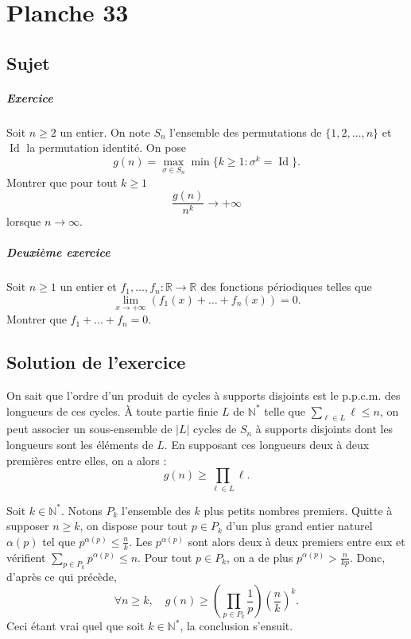 \chapter{Planche 33}

\section{Sujet}

\paragraph{Exercice}

Soit $n \geqslant 2$ un entier.
On note $S_n$ l'ensemble des permutations de $\{1,2,\dots,n\}$ et $\operatorname{Id}$ la permutation identité.
On pose
$$
g(n) = \max_{\sigma \in S_n} \min \{k \geqslant 1 : \sigma^k = \operatorname{Id}\}.
$$
Montrer que pour tout $k \geqslant 1$
\[\frac{g(n)}{n^k} \to +\infty
\]
lorsque $n \to \infty$.

\paragraph{Deuxième exercice}

Soit $n \geqslant 1$ un entier et $f_1,\dots,f_n : \mathbb R \to \mathbb R$ des fonctions périodiques telles que
$$
\lim_{x\to+\infty} (f_1(x) + \dots + f_n(x)) = 0.
$$
Montrer que $f_1 + \dots + f_n = 0$.

\section{Solution de l'exercice}


On sait que l'ordre d'un produit de cycles à supports disjoints est le p.p.c.m. des longueurs de ces cycles.
À toute partie finie $L$ de $\mathbb N^*$ telle que $\sum_{\ell\in L} \ell \leqslant n$, on peut associer un sous-ensemble de $|L|$ cycles de $S_n$ à supports disjoints dont les longueurs sont les éléments de $L$.
En supposant ces longueurs deux à deux premières entre elles, on a alors :
$$
g(n) \geqslant \prod_{\ell \in L} \ell.
$$

Soit $k \in \mathbb N^*$. Notons $P_k$ l'ensemble des $k$ plus petits nombres premiers.
Quitte à supposer $n \geqslant k$, on dispose pour tout $p \in P_k$ d'un plus grand entier naturel $\alpha(p)$ tel que $p^{\alpha(p)} \leqslant \frac nk$.
Les $p^{\alpha(p)}$ sont alors deux à deux premiers entre eux et vérifient $\sum_{p\in P_k} p^{\alpha(p)} \leqslant n$.
Pour tout $p \in P_k$, on a de plus $p^{\alpha(p)} > \frac n{kp}$. Donc, d'après ce qui précède,
$$
\forall n \geqslant k,\quad
g(n) \geqslant \left(\prod_{p\in P_k} \frac1p\right)\left(\frac nk\right)^k.
$$
Ceci étant vrai quel que soit $k \in \mathbb N^*$, la conclusion s'ensuit.

